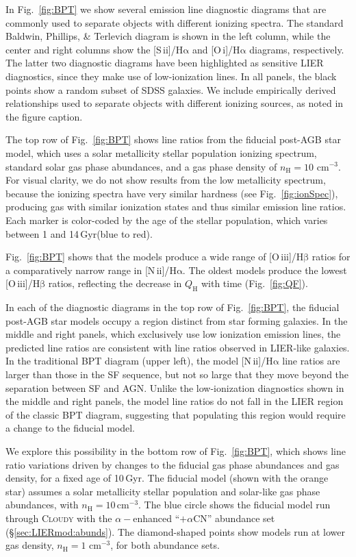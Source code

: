 \documentclass[preprint2]{aastex62}
\newcommand{\Cloudy}{\textsc{Cloudy}\xspace}
\newcommand{\nii}{[N\,{\sc ii}]\xspace}
\newcommand{\sii}{[S\,{\sc ii}]\xspace}
\newcommand{\oiii}{[O\,{\sc iii}]\xspace}
\newcommand{\oi}{[O\,{\sc i}]\xspace}
\newcommand{\ha}{\ensuremath{\mathrm{H\alpha}}\xspace}
\newcommand{\hb}{\ensuremath{\mathrm{H\beta}}\xspace}
\newcommand{\QH}{\ensuremath{Q_{\mathrm{H}}}\xspace}
\newcommand{\Gyr}{$\,$Gyr\xspace}
\newcommand{\alphaCN}{\ensuremath{+\alpha\mathrm{CN}}\xspace}
\begin{document}
In Fig.~\ref{fig:BPT} we show several emission line diagnostic diagrams that are commonly used to separate objects with different ionizing spectra. The standard Baldwin, Phillips, \& Terlevich \citep[BPT;][]{BPT} diagram is shown in the left column, while the center and right columns show the \sii/\ha and \oi/\ha diagrams, respectively. The latter two diagnostic diagrams have been highlighted as sensitive LIER diagnostics, since they make use of low-ionization lines. In all panels, the black points show a random subset of SDSS galaxies. We include empirically derived relationships used to separate objects with different ionizing sources, as noted in the figure caption. 

The top row of Fig.~\ref{fig:BPT} shows line ratios from the fiducial post-AGB star model, which uses a solar metallicity stellar population ionizing spectrum, standard solar gas phase abundances, and a gas phase density of $n_{\mathrm{H}}=10$ cm$^{-3}$. For visual clarity, we do not show results from the low metallicity spectrum, because the ionizing spectra have very similar hardness (see Fig.~\ref{fig:ionSpec}), producing gas with similar ionization states and thus similar emission line ratios. Each marker is color-coded by the age of the stellar population, which varies between 1 and 14\Gyr (blue to red). 

Fig.~\ref{fig:BPT} shows that the models produce a wide range of \oiii/\hb ratios for a comparatively narrow range in \nii/\ha. The oldest models produce the lowest \oiii/\hb ratios, reflecting the decrease in \QH with time (Fig.~\ref{fig:QF}).

In each of the diagnostic diagrams in the top row of Fig.~\ref{fig:BPT}, the fiducial post-AGB star models occupy a region distinct from star forming galaxies. In the middle and right panels, which exclusively use low ionization emission lines, the predicted line ratios are consistent with line ratios observed in LIER-like galaxies. In the traditional BPT diagram (upper left), the model \nii/\ha line ratios are larger than those in the SF sequence, but not so large that they move beyond the separation between SF and AGN. Unlike the low-ionization diagnostics shown in the middle and right panels, the model line ratios do not fall in the LIER region of the classic BPT diagram, suggesting that populating this region would require a change to the fiducial model.

We explore this possibility in the bottom row of Fig.~\ref{fig:BPT}, which shows line ratio variations driven by changes to the fiducial gas phase abundances and gas density, for a fixed age of 10\Gyr. The fiducial model (shown with the orange star) assumes a solar metallicity stellar population and solar-like gas phase abundances, with $n_{\mathrm{H}}=10$\,cm$^{-3}$. The blue circle shows the fiducial model run through \Cloudy with the $\alpha-$enhanced ``\alphaCN'' abundance set (\S\ref{sec:LIERmod:abunds}). The diamond-shaped points show models run at lower gas density, $n_{\mathrm{H}}=1$ cm$^{-3}$, for both abundance sets.
\end{document}
